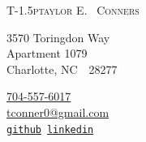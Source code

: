 \documentclass[12p4, letterpaper]{article}
\makeatletter
\def\myemail{tconner0@gmail.com}
\def\myphone{704-557-6017}
\def\myweb{tconners087}
\makeatother
\begin{document}
\reversemarginpar
\setlength\marginparwidth{0.85in}

\pagestyle{fancy} \setlength\headwidth{6.5in}
 \cfoot{}
\thispagestyle{empty}
\setlength{\headsep}{0.0in}
\begin{adjustwidth}{-1in}{}
{\Huge
	{\textsc{%
		{T}\kern-1.5ptaylor
		{E}\kern-2pt.~%
		{C}onners}
	}
}
\medskip\medskip

{
	\begin{minipage}[b]{2in}
		\flushleft \footnotesize 
		3570 Toringdon Way \\ 
		Apartment 1079 \\ 
		Charlotte, NC~~28277
	\end{minipage}
	\hfill
	\begin{minipage}[b]{1.2in}
		\flushright \footnotesize 
		\href{tel:\myphone}{\myphone} \\ %
		\href{mailto:\myemail}{\myemail} \\
		\href{https://www.github.com/\myweb}{\texttt{github}}~\href{https://www.linkedin.com/in/\myweb}{\texttt{linkedin}}
	\end{minipage}
}\par

\hrulefill
\end{adjustwidth}

\end{document}
